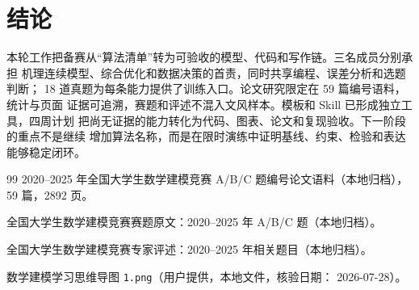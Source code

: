 \section{结论}

本轮工作把备赛从“算法清单”转为可验收的模型、代码和写作链。三名成员分别承担
机理连续模型、综合优化和数据决策的首责，同时共享编程、误差分析和选题判断；
18 道真题为每条能力提供了训练入口。论文研究限定在 59 篇编号语料，统计与页面
证据可追溯，赛题和评述不混入文风样本。模板和 Skill 已形成独立工具，四周计划
把尚无证据的能力转化为代码、图表、论文和复现验收。下一阶段的重点不是继续
增加算法名称，而是在限时演练中证明基线、约束、检验和表达能够稳定闭环。

\begin{thebibliography}{99}
2020--2025 年全国大学生数学建模竞赛 A/B/C 题编号论文语料（本地归档），
59 篇，2892 页。

全国大学生数学建模竞赛赛题原文：2020--2025 年 A/B/C 题（本地归档）。

全国大学生数学建模竞赛专家评述：2020--2025 年相关题目（本地归档）。

数学建模学习思维导图 \texttt{1.png}（用户提供，本地文件，核验日期：
2026-07-28）。
\end{thebibliography}

\appendix
